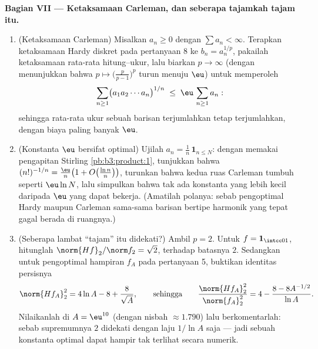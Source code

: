 \begin{problem}
\medskip
\noindent\textbf{Bagian VII --- Ketaksamaan Carleman, dan seberapa
tajamkah tajam itu.}
\begin{enumerate}[resume]
  \item (Ketaksamaan Carleman) Misalkan $a_n \geq 0$ dengan $\sum
        a_n < \infty$. Terapkan ketaksamaan Hardy diskret pada
        pertanyaan 8 ke $b_n = a_n^{1/p}$, pakailah
        ketaksamaan rata-rata hitung--ukur, lalu biarkan $p \to
        \infty$ (dengan menunjukkan bahwa $p \mapsto
        \bigl(\frac p{p-1}\bigr)^p$ turun menuju $\eu$) untuk
        memperoleh
        \[
        \sum_{n\geq1}\bigl(a_1a_2\cdots a_n\bigr)^{1/n}
        \;\leq\; \eu\,\sum_{n\geq1}a_n :
        \]
        sehingga rata-rata ukur sebuah barisan terjumlahkan tetap
        terjumlahkan, dengan biaya paling banyak $\eu$.
  \item (Konstanta $\eu$ bersifat optimal) Ujilah $a_n =
        \frac1n\,\mathbf 1_{n\leq N}$: dengan memakai pengapitan
        Stirling \cref{pb:b3:product:1}, tunjukkan bahwa
        $(n!)^{-1/n} = \frac\eu n\bigl(1 +
        O\bigl(\frac{\ln n}n\bigr)\bigr)$, turunkan bahwa kedua
        ruas Carleman tumbuh seperti $\eu\ln N$, lalu simpulkan
        bahwa tak ada konstanta yang lebih kecil daripada $\eu$ yang dapat bekerja. (Amatilah
        polanya: sebab pengoptimal Hardy maupun Carleman
        sama-sama barisan bertipe harmonik yang tepat gagal
        berada di ruangnya.)
  \item (Seberapa lambat ``tajam'' itu didekati?) Ambil $p = 2$.
        Untuk $f = \mathbf 1_{\intcc01}$, hitunglah
        $\norm{Hf}_2/\norm f_2 = \sqrt2$, terhadap batasnya
        $2$. Sedangkan untuk pengoptimal hampiran $f_A$ pada pertanyaan 5,
        buktikan identitas persisnya
        \[
        \norm{Hf_A}_2^2 = 4\ln A - 8 + \frac{8}{\sqrt A},
        \qquad\text{sehingga}\qquad
        \frac{\norm{Hf_A}_2^2}{\norm{f_A}_2^2}
        = 4 - \frac{8 - 8A^{-1/2}}{\ln A} .
        \]
        Nilaikanlah di $A = \eu^{10}$ (dengan nisbah $\approx 1.790$)
        lalu berkomentarlah: sebab supremumnya $2$ didekati dengan laju
        $1/\ln A$ saja --- jadi sebuah konstanta optimal dapat hampir
        tak terlihat secara numerik.

\end{enumerate}
\end{problem}
